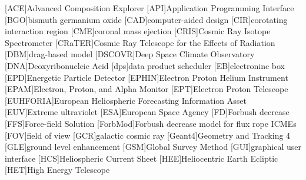 	\begin{acronym}\itemsep0pt
	[ACE]{Advanced Composition Explorer}
	[API]{Application Programming Interface}
	[BGO]{bismuth germanium oxide}
	[CAD]{computer-aided design}
	[CIR]{corotating interaction region}
	[CME]{coronal mass ejection}
	[CRIS]{Cosmic Ray Isotope Spectrometer}
	[CRaTER]{Cosmic Ray Telescope for the Effects of Radiation}
	[DBM]{drag-based model}
	[DSCOVR]{Deep Space Climate Observatory}
	[DNA]{Deoxyribonucleic Acid}
	[dps]{data product scheduler}
	[EB]{electroninc box}
	[EPD]{Energetic Particle Detector}
	[EPHIN]{Electron Proton Helium Instrument}
	[EPAM]{Electron, Proton, and Alpha Monitor}
	[EPT]{Electron Proton Telescope}
    [EUHFORIA]{European Heliospheric Forecasting Information Asset}
	[EUV]{Extreme ultraviolet}
	[ESA]{European Space Agency}
	[FD]{Forbush decrease}
	[FFS]{Force-field Solution}
	[ForbMod]{Forbush decrease model for flux rope \acsp{ICME}}
	[FOV]{field of view}
	[GCR]{galactic cosmic ray}
	[Geant4]{Geometry and Tracking 4}
	[GLE]{ground level enhancement}
	[GSM]{Global Survey Method}
	[GUI]{graphical user interface}
	[HCS]{Heliospheric Current Sheet}
	[HEE]{Heliocentric Earth Ecliptic}
	[HET]{High Energy Telescope}

\end{acronym}
